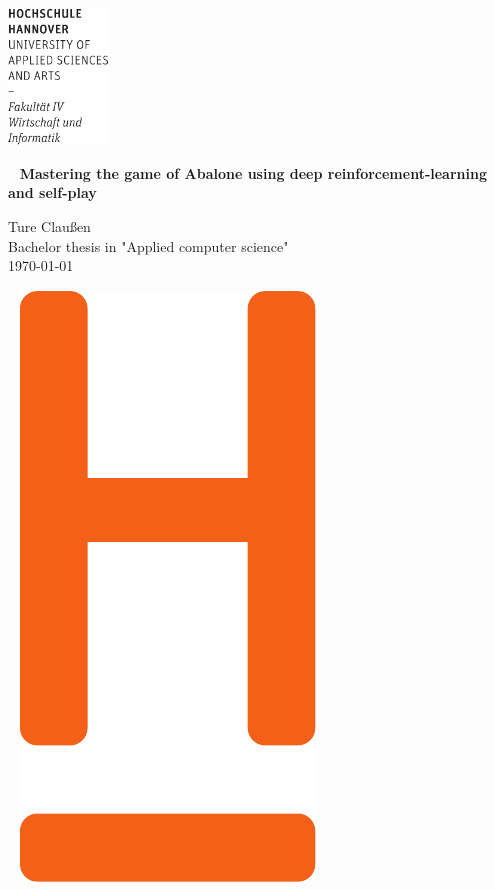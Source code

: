 \documentclass[fontsize=12pt,paper=a4,twoside,parskip=half-,headsepline,headinclude, abstract=on]{scrreprt}
\begin{document}
\thispagestyle{empty}
\includegraphics[width=0.2\textwidth]{../lib/Wortmarke_WI_schwarz}

{  ~ \sffamily
    \vfill
    {\Huge\bfseries Mastering the game of Abalone using deep reinforcement-learning and self-play}
    \bigskip

    {\Large
        Ture Claußen \\[2ex]
        Bachelor thesis in "Applied computer science"
        \\[5ex]
        \today }
}
\vfill

~ \hfill
\includegraphics[height=0.3\paperheight]{../lib/H_WI_Pantone1665}

\vspace*{-3cm}
\end{document}
